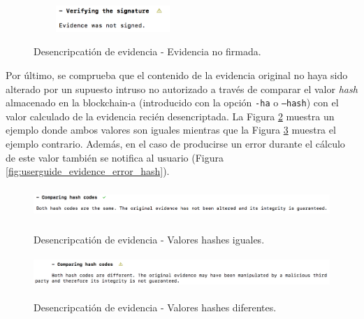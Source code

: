 \documentclass[12pt,a4paper, twoside]{report}
\begin{document}
		\newpage
		
		\begin{figure}[!ht]   
			\caption{Desencripcatión de evidencia - Evidencia no firmada.} 
			\begin{center} 					\includegraphics[width=6cm,height=1cm]{Images/userGuide/evidence/notsigned} \\
				\label{fig:userguide_evidence_notsigned} 
			\end{center}  
		\end{figure}

	Por último, se comprueba que el contenido de la evidencia original no haya sido alterado por un supuesto intruso no autorizado a través de comparar el valor \textit{hash} almacenado en la \gls{blockchain-a} (introducido con la opción \texttt{-ha} o \texttt{--hash}) con el valor calculado de la evidencia recién desencriptada. La Figura \ref{fig:userguide_evidence_hashes} muestra un ejemplo donde ambos valores son iguales mientras que la Figura \ref{fig:userguide_evidence_different_hashes} muestra el ejemplo contrario. Además, en el caso de producirse un error durante el cálculo de este valor también se notifica al usuario (Figura \ref{fig:userguide_evidence_error_hash}). 
	
		\begin{figure}[!ht]   
			\caption{Desencripcatión de evidencia - Valores hashes iguales.} 
			\begin{center} 					\includegraphics[width=14cm,height=1.2cm]{Images/userGuide/evidence/hashes} \\
				\label{fig:userguide_evidence_hashes} 
			\end{center}  
		\end{figure}
		
		\begin{figure}[!ht]   
			\caption{Desencripcatión de evidencia - Valores hashes diferentes.} 
			\begin{center} 					\includegraphics[width=17cm,height=1.2cm]{Images/userGuide/evidence/different_hashes} \\
				\label{fig:userguide_evidence_different_hashes} 
			\end{center}  
		\end{figure}
		
\end{document}
